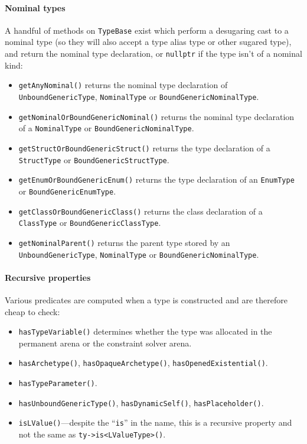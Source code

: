 \documentclass[../generics]{subfiles}
\begin{document}
\paragraph{Nominal types} A handful of methods on \texttt{TypeBase} exist which perform a desugaring cast to a nominal type (so they will also accept a type alias type or other sugared type), and return the nominal type declaration, or \texttt{nullptr} if the type isn't of a nominal kind:
\begin{itemize}
\item \texttt{getAnyNominal()} returns the nominal type declaration of \texttt{UnboundGenericType}, \texttt{NominalType} or \texttt{BoundGenericNominalType}.
\item \texttt{getNominalOrBoundGenericNominal()} returns the nominal type declaration of a \texttt{NominalType} or \texttt{BoundGenericNominalType}.
\item \texttt{getStructOrBoundGenericStruct()} returns the type declaration of a \texttt{StructType} or \texttt{BoundGenericStructType}.
\item \texttt{getEnumOrBoundGenericEnum()} returns the type declaration of an \texttt{EnumType} or \texttt{BoundGenericEnumType}.
\item \texttt{getClassOrBoundGenericClass()} returns the class declaration of a \texttt{ClassType} or \texttt{BoundGenericClassType}.
\item \texttt{getNominalParent()} returns the parent type stored by an \texttt{UnboundGenericType}, \texttt{NominalType} or \texttt{BoundGenericNominalType}.
\end{itemize}

\paragraph{Recursive properties} Various predicates are computed when a type is constructed and are therefore cheap to check:
\begin{itemize}
\item \texttt{hasTypeVariable()} determines whether the type was allocated in the permanent arena or the constraint solver arena.
\item \texttt{hasArchetype()}, \texttt{hasOpaqueArchetype()}, \texttt{hasOpenedExistential()}.
\item \texttt{hasTypeParameter()}.
\item \texttt{hasUnboundGenericType()}, \texttt{hasDynamicSelf()}, \texttt{hasPlaceholder()}.
\item \texttt{isLValue()}---despite the ``\texttt{is}'' in the name, this is a recursive property and not the same as \verb|ty->is<LValueType>()|.
\end{itemize}
\end{document}
